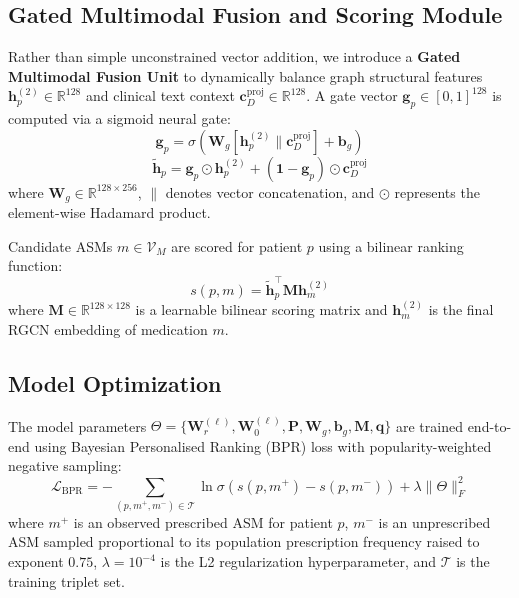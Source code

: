 \documentclass[11pt,a4paper]{article}
\begin{document}
\subsection{Gated Multimodal Fusion and Scoring Module}

Rather than simple unconstrained vector addition, we introduce a \textbf{Gated Multimodal Fusion Unit} to dynamically balance graph structural features $\mathbf{h}_p^{(2)} \in \mathbb{R}^{128}$ and clinical text context $\mathbf{c}_D^{\text{proj}} \in \mathbb{R}^{128}$. A gate vector $\mathbf{g}_p \in [0, 1]^{128}$ is computed via a sigmoid neural gate:
\begin{equation}
\mathbf{g}_p = \sigma \left( \mathbf{W}_g \left[ \mathbf{h}_p^{(2)} \parallel \mathbf{c}_D^{\text{proj}} \right] + \mathbf{b}_g \right)
\label{eq:gate}
\end{equation}
\begin{equation}
\tilde{\mathbf{h}}_p = \mathbf{g}_p \odot \mathbf{h}_p^{(2)} + (\mathbf{1} - \mathbf{g}_p) \odot \mathbf{c}_D^{\text{proj}}
\label{eq:fusion}
\end{equation}
where $\mathbf{W}_g \in \mathbb{R}^{128 \times 256}$, $\parallel$ denotes vector concatenation, and $\odot$ represents the element-wise Hadamard product.

Candidate ASMs $m \in \mathcal{V}_M$ are scored for patient $p$ using a bilinear ranking function:
\begin{equation}
s(p, m) = \tilde{\mathbf{h}}_p^\top \mathbf{M} \mathbf{h}_m^{(2)}
\label{eq:scoring}
\end{equation}
where $\mathbf{M} \in \mathbb{R}^{128 \times 128}$ is a learnable bilinear scoring matrix and $\mathbf{h}_m^{(2)}$ is the final RGCN embedding of medication $m$.

\subsection{Model Optimization}

The model parameters $\Theta = \{\mathbf{W}_r^{(\ell)}, \mathbf{W}_0^{(\ell)}, \mathbf{P}, \mathbf{W}_g, \mathbf{b}_g, \mathbf{M}, \mathbf{q}\}$ are trained end-to-end using Bayesian Personalised Ranking (BPR) loss \cite{rendle2009bpr} with popularity-weighted negative sampling:
\begin{equation}
\mathcal{L}_{\text{BPR}} = - \sum_{(p, m^+, m^-) \in \mathcal{T}} \ln \sigma \left( s(p, m^+) - s(p, m^-) \right) + \lambda \|\Theta\|_F^2
\label{eq:bpr_loss}
\end{equation}
where $m^+$ is an observed prescribed ASM for patient $p$, $m^-$ is an unprescribed ASM sampled proportional to its population prescription frequency raised to exponent $0.75$, $\lambda = 10^{-4}$ is the L2 regularization hyperparameter, and $\mathcal{T}$ is the training triplet set.
\end{document}
